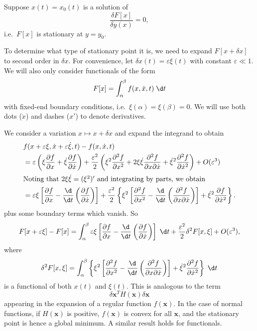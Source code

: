 \documentclass[a4paper]{article}
\begin{document}
Suppose $x(t) = x_0(t)$ is a solution of
\[
  \frac{\delta F[x]}{\delta y(x)} = 0,
\]
i.e.\ $F[x]$ is stationary at $y = y_0$.

To determine what type of stationary point it is, we need to expand $F[x + \delta x]$ to second order in $\delta x$. For convenience, let $\delta x(t) = \varepsilon \xi(t)$ with constant $\varepsilon \ll 1$. We will also only consider functionals of the form
\[
  F[x] = \int_\alpha^\beta f(x, \dot{x}, t)\;\d t
\]
with fixed-end boundary conditions, i.e.\ $\xi(\alpha) = \xi(\beta) = 0$. We will use both dots ($\dot{x}$) and dashes ($x'$) to denote derivatives.

We consider a variation $x \mapsto x + \delta x$ and expand the integrand to obtain
\begin{align*}
  &f(x + \varepsilon \xi, \dot{x} + \varepsilon \dot{\xi}, t) - f(x, \dot{x}, t)\\
  &= \varepsilon \left(\xi \frac{\partial f}{\partial x} + \dot{\xi}\frac{\partial f}{\partial \dot{x}}\right) + \frac{\varepsilon^2}{2}\left(\xi^2 \frac{\partial^2 f}{\partial x^2} + 2\xi\dot{\xi} \frac{\partial^2 f}{\partial x \partial \dot{x}} + \dot{\xi}^2 \frac{\partial^2 f}{\partial \dot{x}^2}\right) + O(\varepsilon^3)\\
  \intertext{Noting that $2\xi \dot{\xi} = (\xi^2)'$ and integrating by parts, we obtain}
  &= \varepsilon \xi\left[\frac{\partial f}{\partial x} - \frac{\d}{\d t}\left(\frac{\partial f}{\partial \dot{x}}\right)\right] + \frac{\varepsilon^2}{2}\left\{\xi^2\left[\frac{\partial^2 f}{\partial x^2} - \frac{\d}{\d t}\left(\frac{\partial^2 f}{\partial x\partial \dot{x}}\right)\right] + \dot{\xi}^2 \frac{\partial f}{\partial \dot{x}^2}\right\}.
\end{align*}
plus some boundary terms which vanish. So
\[
  F[x + \varepsilon \xi] - F[x] = \int_\alpha^\beta\varepsilon\xi\left[\frac{\partial f}{\partial x} - \frac{\d}{\d t}\left(\frac{\partial f}{\partial \dot{x}}\right)\right]\;\d t + \frac{\varepsilon^2}{2}\delta^2 F[x, \xi] + O(\varepsilon^3),
\]
where
\[
  \delta^2 F[x, \xi] = \int_\alpha^\beta \left\{\xi^2 \left[\frac{\partial^2 f}{\partial x^2} - \frac{\d}{\d t}\left(\frac{\partial^2 f}{\partial x \partial \dot{x}}\right)\right] + \dot{\xi}^2 \frac{\partial^2 f}{\partial \dot{x}^2}\right\}\;\d t
\]
is a functional of both $x(t)$ and $\xi(t)$. This is analogous to the term
\[
  \delta \mathbf{x}^T H(\mathbf{x})\delta \mathbf{x}
\]
appearing in the expansion of a regular function $f(\mathbf{x})$. In the case of normal functions, if $H(\mathbf{x})$ is positive, $f(\mathbf{x})$ is convex for all $\mathbf{x}$, and the stationary point is hence a global minimum. A similar result holds for functionals.
\end{document}
